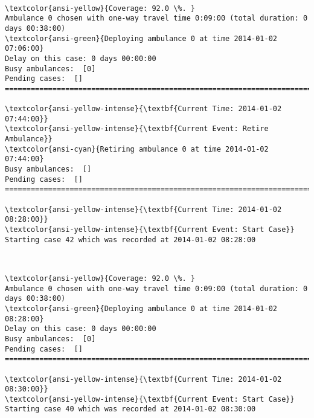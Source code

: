 \documentclass[11pt]{article}
\begin{document}
    \begin{center}
    \end{center}
    { \hspace*{\fill} \\}
    
    \begin{Verbatim}[commandchars=\\\{\}]
\textcolor{ansi-yellow}{Coverage: 92.0 \%. }
Ambulance 0 chosen with one-way travel time 0:09:00 (total duration: 0 days 00:38:00)
\textcolor{ansi-green}{Deploying ambulance 0 at time 2014-01-02 07:06:00}
Delay on this case: 0 days 00:00:00
Busy ambulances:  [0]
Pending cases:  []
========================================================================

\textcolor{ansi-yellow-intense}{\textbf{Current Time: 2014-01-02 07:44:00}}
\textcolor{ansi-yellow-intense}{\textbf{Current Event: Retire Ambulance}}
\textcolor{ansi-cyan}{Retiring ambulance 0 at time 2014-01-02 07:44:00}
Busy ambulances:  []
Pending cases:  []
========================================================================

\textcolor{ansi-yellow-intense}{\textbf{Current Time: 2014-01-02 08:28:00}}
\textcolor{ansi-yellow-intense}{\textbf{Current Event: Start Case}}
Starting case 42 which was recorded at 2014-01-02 08:28:00

    \end{Verbatim}

    \begin{center}
    \end{center}
    { \hspace*{\fill} \\}
    
    \begin{Verbatim}[commandchars=\\\{\}]
\textcolor{ansi-yellow}{Coverage: 92.0 \%. }
Ambulance 0 chosen with one-way travel time 0:09:00 (total duration: 0 days 00:38:00)
\textcolor{ansi-green}{Deploying ambulance 0 at time 2014-01-02 08:28:00}
Delay on this case: 0 days 00:00:00
Busy ambulances:  [0]
Pending cases:  []
========================================================================

\textcolor{ansi-yellow-intense}{\textbf{Current Time: 2014-01-02 08:30:00}}
\textcolor{ansi-yellow-intense}{\textbf{Current Event: Start Case}}
Starting case 40 which was recorded at 2014-01-02 08:30:00

    \end{Verbatim}
\end{document}
